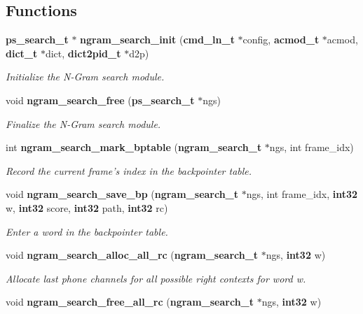 \subsection*{\-Functions}
\begin{DoxyCompactItemize}
\item 
{\bf ps\-\_\-search\-\_\-t} $\ast$ {\bf ngram\-\_\-search\-\_\-init} ({\bf cmd\-\_\-ln\-\_\-t} $\ast$config, {\bf acmod\-\_\-t} $\ast$acmod, {\bf dict\-\_\-t} $\ast$dict, {\bf dict2pid\-\_\-t} $\ast$d2p)\label{ngram__search_8h_afa0dcbb86340083bce1412c9309742bc}

\begin{DoxyCompactList}\small\item\em \-Initialize the \-N-\/\-Gram search module. \end{DoxyCompactList}\item 
void {\bf ngram\-\_\-search\-\_\-free} ({\bf ps\-\_\-search\-\_\-t} $\ast$ngs)\label{ngram__search_8h_a9bafaa4af5a9a4f9e76a8daf54ac4a11}

\begin{DoxyCompactList}\small\item\em \-Finalize the \-N-\/\-Gram search module. \end{DoxyCompactList}\item 
int {\bf ngram\-\_\-search\-\_\-mark\-\_\-bptable} ({\bf ngram\-\_\-search\-\_\-t} $\ast$ngs, int frame\-\_\-idx)
\begin{DoxyCompactList}\small\item\em \-Record the current frame's index in the backpointer table. \end{DoxyCompactList}\item 
void {\bf ngram\-\_\-search\-\_\-save\-\_\-bp} ({\bf ngram\-\_\-search\-\_\-t} $\ast$ngs, int frame\-\_\-idx, {\bf int32} w, {\bf int32} score, {\bf int32} path, {\bf int32} rc)\label{ngram__search_8h_ae36649be6f5a2190e759e7ed13bd7b6b}

\begin{DoxyCompactList}\small\item\em \-Enter a word in the backpointer table. \end{DoxyCompactList}\item 
void {\bf ngram\-\_\-search\-\_\-alloc\-\_\-all\-\_\-rc} ({\bf ngram\-\_\-search\-\_\-t} $\ast$ngs, {\bf int32} w)\label{ngram__search_8h_a1ddcc1a9cb3e164ceb2140097ed23a3e}

\begin{DoxyCompactList}\small\item\em \-Allocate last phone channels for all possible right contexts for word w. \end{DoxyCompactList}\item 
void {\bf ngram\-\_\-search\-\_\-free\-\_\-all\-\_\-rc} ({\bf ngram\-\_\-search\-\_\-t} $\ast$ngs, {\bf int32} w)\label{ngram__search_8h_a15477192481dffcb29e9c4167eff6c3c}


\end{DoxyCompactItemize}
